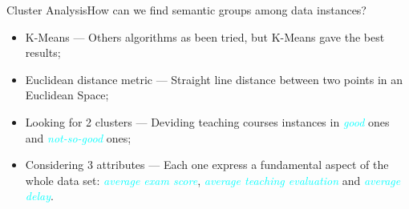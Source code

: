 \begin{frame}{Cluster Analysis}{How can we find semantic groups among data instances?}

\vspace{0.1cm}
 \vspace{0,3cm}
\vspace{-0.2cm}
	\begin{block}{}
		\begin{itemize}
			\item<1-> \alert{K-Means} --- Others algorithms as been tried, but K-Means gave the best results; \vspace{0.2cm}
            \item<2-> \alert{Euclidean distance metric} --- Straight line distance between two points in an Euclidean Space; \vspace{0.2cm}
			\item<3-> \alert{Looking for 2 clusters} --- Deviding teaching courses instances in \textcolor{cyan}{\emph{good}} ones and \textcolor{cyan}{\emph{not-so-good}} ones; \vspace{0.2cm}
			\item<4-> \alert{Considering 3 attributes} --- Each one express a fundamental aspect of the whole data set: \textcolor{cyan}{\emph{average exam score}}, \textcolor{cyan}{\emph{average teaching evaluation}} and \textcolor{cyan}{\emph{average delay}}.
		\end{itemize}
	\end{block}

\end{frame}

